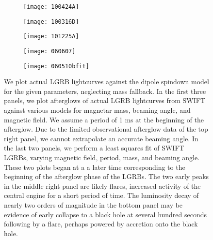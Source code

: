 \documentclass{article}
\begin{document}
\begin{figure}[h!]
\centering
\begin{subfigure}{.5\textwidth}
    \centering
    \texttt{[image: 100424A]}
    \caption{}
    \label{fig:3a}
\end{subfigure}%
\begin{subfigure}{.5\textwidth}
    \centering
    \texttt{[image: 100316D]}
    \caption{}
    \label{fig:3b}
\end{subfigure}
\begin{subfigure}{.5\textwidth}
    \centering
    \texttt{[image: 101225A]}
    \caption{}
    \label{fig:3c}
\end{subfigure}%
\begin{subfigure}{.5\textwidth}
    \centering
    \texttt{[image: 060607]}
    \caption{}
    \label{fig:3d}
\end{subfigure}
\begin{subfigure}{.5\textwidth}
    \centering
    \texttt{[image: 060510bfit]}
    \caption{}
    \label{fig:3e}
\end{subfigure}
\caption{\footnotesize{We plot actual LGRB lightcurves against the dipole spindown model for the given parameters, neglecting mass fallback. In the first three panels, we plot afterglows of actual LGRB lightcurves from SWIFT against various models for magnetar mass, beaming angle, and magnetic field. We assume a period of 1 ms at the beginning of the afterglow. Due to the limited observational afterglow data of the top right panel, we cannot extrapolate an accurate beaming angle. In the last two panels, we perform a least squares fit of SWIFT LGRBs, varying magnetic field, period, mass, and beaming angle. These two plots began at a a later time corresponding to the beginning of the afterglow phase of the LGRBs. The two early peaks in the middle right panel are likely flares, increased activity of the central engine for a short period of time. The luminosity decay of nearly two orders of magnitude in the bottom panel  may be evidence of early collapse to a black hole at several hundred seconds following by a flare, perhaps powered by accretion onto the black hole.}}
\label{fig:3}
\end{figure}
\end{document}

